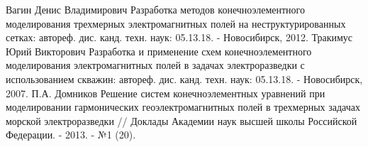 \documentclass[14pt,a4paper]{extreport}
\begin{document}
\begin{thebibliography}{00}
    		Вагин Денис Владимирович Разработка методов конечноэлементного моделирования трехмерных электромагнитных полей на неструктурированных сетках: автореф. дис. канд. техн. наук: 05.13.18. - Новосибирск, 2012.
    		Тракимус Юрий Викторович Разработка и применение схем конечноэлементного моделирования электромагнитных полей в задачах электроразведки с использованием скважин: автореф. дис. канд. техн. наук: 05.13.18. - Новосибирск, 2007.
    		П.А. Домников Решение систем конечноэлементных уравнений при моделировании гармонических геоэлектромагнитных полей в трехмерных задачах морской электроразведки // Доклады Академии наук высшей школы Российской Федерации. - 2013. - №1 (20).
\end{thebibliography}

\newpage
%
%

\end{document}
